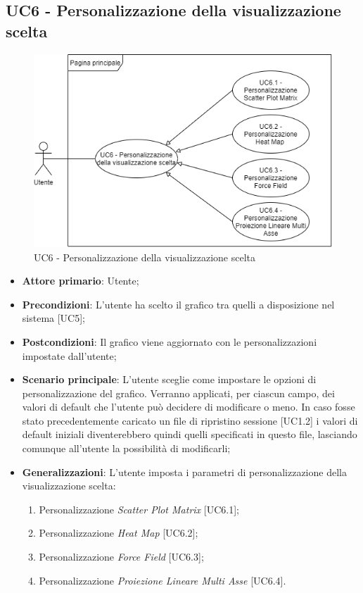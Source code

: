 \subsection{UC6 - Personalizzazione della visualizzazione scelta}
\begin{figure}[h]
\includegraphics[width=\linewidth]{Section/Images/UC6.png}
\centering
\caption{UC6 - Personalizzazione della visualizzazione scelta}
\end{figure}
\begin{itemize}
	\item \textbf{Attore primario}: Utente;
	
	\item \textbf{Precondizioni}: L'utente ha scelto il grafico tra quelli a disposizione nel sistema [UC5];
	
	\item \textbf{Postcondizioni}: Il grafico viene aggiornato con le personalizzazioni impostate dall'utente;
	
	\item \textbf{Scenario principale}: L’utente sceglie come impostare le opzioni di personalizzazione del grafico. Verranno applicati, per ciascun campo, dei valori di default che l'utente può decidere di modificare o meno. In caso fosse stato precedentemente caricato un file di ripristino sessione [UC1.2] i valori di default iniziali diventerebbero quindi quelli specificati in questo file, lasciando comunque all'utente la possibilità di modificarli;
	
	\item \textbf{Generalizzazioni}: L'utente imposta i parametri di personalizzazione della visualizzazione scelta:
	\begin{enumerate}
	\item Personalizzazione \textit{Scatter Plot Matrix} [UC6.1];
	\item Personalizzazione \textit{Heat Map} [UC6.2];
	\item Personalizzazione \textit{Force Field} [UC6.3];
	\item Personalizzazione \textit{Proiezione Lineare Multi Asse} [UC6.4].
	\end{enumerate}
		
\end{itemize}


